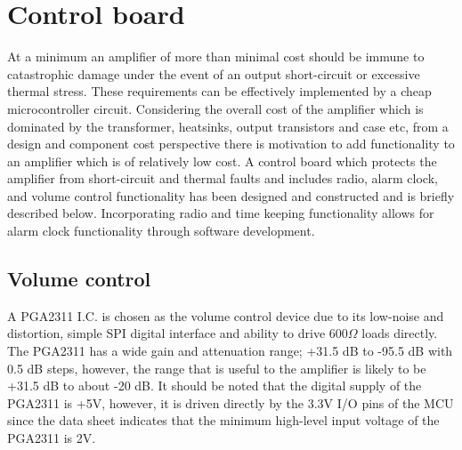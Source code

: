 \documentclass[a4paper,10pt, oneside]{article}
\begin{document}
\section{Control board}
At a minimum an amplifier of more than minimal cost should be immune to catastrophic damage under the event of an output short-circuit 
or excessive thermal stress. These requirements can be effectively implemented by a cheap microcontroller circuit. 
Considering the overall cost of the amplifier which is dominated by the transformer, heatsinks, output transistors and case etc, 
from a design  and component cost perspective there is motivation to add functionality to an amplifier which is of relatively low cost. 
A control board which protects the amplifier from short-circuit and thermal faults and includes radio, alarm clock, and volume control 
functionality has been designed and constructed and is briefly described below. Incorporating radio and time keeping functionality allows 
for alarm clock functionality through software development. 
\subsection*{Volume control}
A PGA2311 I.C. is chosen as the volume control device due to its low-noise and distortion, simple SPI digital interface 
and ability to drive 600$\Omega$ loads directly. The PGA2311 has a wide gain and attenuation range; +31.5 dB to -95.5 dB with 0.5 dB steps, 
however, the range that is useful to the amplifier is likely to be +31.5 dB to about -20 dB. It should be noted that the digital supply 
of the PGA2311 is +5V, however, it is driven directly by the 3.3V I/O pins of the MCU since the data sheet indicates that the minimum 
high-level input voltage of the PGA2311 is 2V. 
\end{document}
